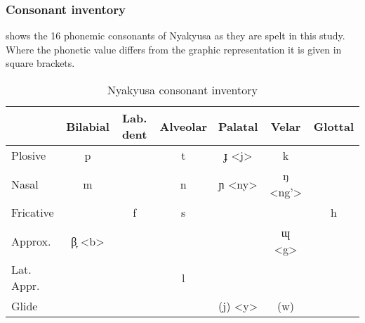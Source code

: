 \subsubsection{Consonant inventory}
 shows the 16 phonemic consonants of Nyakyusa as they are spelt in this study. Where the phonetic value differs from the graphic representation it is given in square brackets.
\begin{table}[H] %
	
	
	\begin{tabular}{|l|c|c|c|c|c|c|}
		\hline & 
		\footnotesize{Bilabial}&
		\footnotesize{Lab. dent}&
		\footnotesize{Alveolar}&
		\footnotesize{Palatal}&
		\footnotesize{Velar}&
		\footnotesize{Glottal}\\	
		\hline Plosive &  				%
		p  &							%
		&							%
		t  &							%
		ɟ <j> &					%
		k &							%
		\\							%
		\hline Nasal & 					%
		m &							%
		&							%
		n &							%
		ɲ <ny> &						%
		ŋ <ng'> &  					%
		\\							%
		\hline Fricative & 				%
		& 							%
		f &							%
		s &							%
		&							%
		&							%
		h \\						%
		\hline Approx. &				%
		β̞ <b>   &     			%
		&						%
		&						%
		&						%
		ɰ <g> &				%
		\\						%
		\hline Lat. Appr. & 			%
		&						%
		&						%
		l &			%
		& 						%
		&						%
		\\						%
		\hline Glide & 				%
		&						%
		&						%
		&						%
		(j) <y>  &				%
		(w) &					%
		\\						%
		\hline
	\end{tabular}	
	\caption{Nyakyusa consonant inventory}
\label{TableConsonantInventory}	
\end{table}

